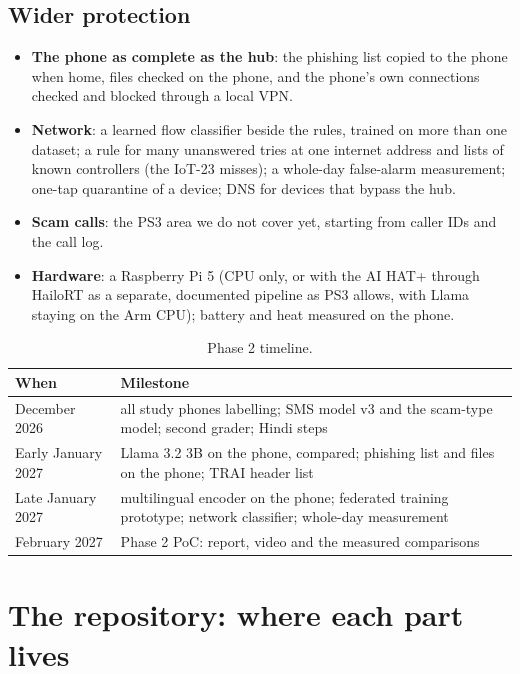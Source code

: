 \documentclass[11pt,a4paper]{article}
\begin{document}
\subsection{Wider protection}
\begin{itemize}
  \item \textbf{The phone as complete as the hub}: the phishing list copied to the phone when home, files checked on the
        phone, and the phone's own connections checked and blocked through a local VPN.
  \item \textbf{Network}: a learned flow classifier beside the rules, trained on more than one dataset; a rule for many
        unanswered tries at one internet address and lists of known controllers (the IoT-23 misses); a whole-day
        false-alarm measurement; one-tap quarantine of a device; DNS for devices that bypass the hub.
  \item \textbf{Scam calls}: the PS3 area we do not cover yet, starting from caller IDs and the call log.
  \item \textbf{Hardware}: a Raspberry Pi 5 (CPU only, or with the AI HAT+ through HailoRT as a separate, documented
        pipeline as PS3 allows, with Llama staying on the Arm CPU); battery and heat measured on the phone.
\end{itemize}

\begin{table}[H]
\centering\small
\begin{tabularx}{\textwidth}{@{}>{\raggedright\arraybackslash}p{3.0cm}X@{}}
\toprule
\textbf{When} & \textbf{Milestone}\\
\midrule
December 2026 & all study phones labelling; SMS model v3 and the scam-type model; second grader; Hindi steps\\
Early January 2027 & Llama 3.2 3B on the phone, compared; phishing list and files on the phone; TRAI header list\\
Late January 2027 & multilingual encoder on the phone; federated training prototype; network classifier; whole-day measurement\\
5 February 2027 & Phase 2 PoC: report, video and the measured comparisons\\
\bottomrule
\end{tabularx}
\caption{Phase 2 timeline.}
\end{table}

\section{The repository: where each part lives}
\label{sec:repo}
\end{document}
